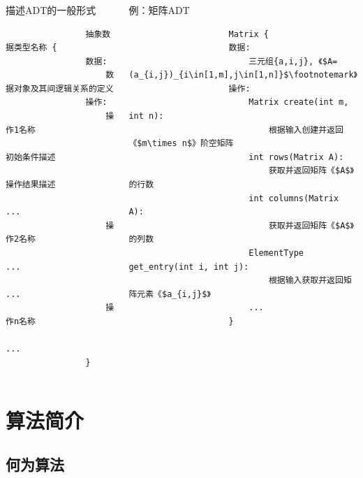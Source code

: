 \begin{fragile}
    \frametitle{\insertsubsectionhead}
    \begin{columns}
        \begin{block}{描述ADT的一般形式}
            \begin{verbatim}
                抽象数据类型名称 {
                数据:
                    数据对象及其间逻辑关系的定义
                操作:
                    操作1名称
                        初始条件描述
                        操作结果描述
                        ...
                    操作2名称
                        ...
                    ...
                    操作n名称
                        ...
                }
            \end{verbatim}
        \end{block}
        \pause
        \begin{exampleblock}{例：矩阵ADT}
            \begin{verbatim}
                    Matrix {
                    数据:
                        三元组{a,i,j}, 《$A=(a_{i,j})_{i\in[1,m],j\in[1,n]}$\footnotemark》
                    操作:
                        Matrix create(int m, int n):
                            根据输入创建并返回《$m\times n$》阶空矩阵
                        int rows(Matrix A):
                            获取并返回矩阵《$A$》的行数
                        int columns(Matrix A):
                            获取并返回矩阵《$A$》的列数
                        ElementType get_entry(int i, int j):
                            根据输入获取并返回矩阵元素《$a_{i,j}$》
                        ...
                    }
                \end{verbatim}
        \end{exampleblock}
    \end{columns}
\end{fragile}

\section{算法简介}

\subsection{何为算法}

